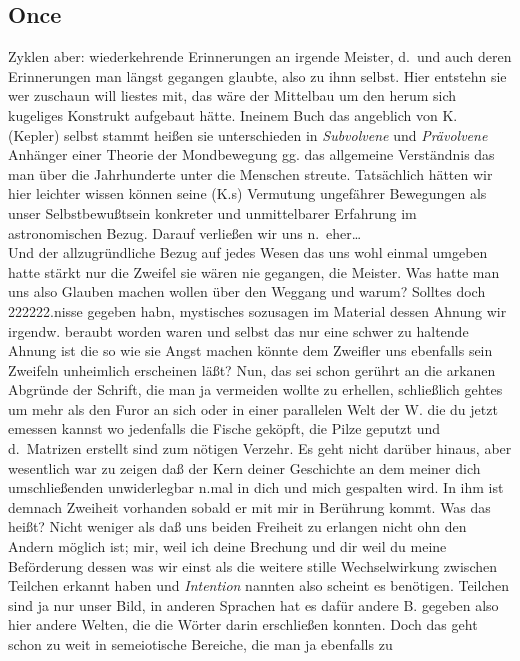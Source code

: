 \documentclass[
]{article}
\author{}
\date{\vspace{-2.5em}}
\begin{document}
\subsection{Once}\label{once}

Zyklen aber: wiederkehrende Erinnerungen an irgende Meister, d.~und auch
deren Erinnerungen man längst gegangen glaubte, also zu ihnn selbst.
Hier entstehn sie wer zuschaun will liestes mit, das wäre der Mittelbau
um den herum sich kugeliges Konstrukt aufgebaut hätte. Ineinem Buch das
angeblich von K. (Kepler) selbst stammt heißen sie unterschieden in
\emph{Subvolvene }und \emph{Prävolvene} Anhänger einer Theorie der
Mondbewegung gg. das allgemeine Verständnis das man über die
Jahrhunderte unter die Menschen streute. Tatsächlich hätten wir hier
leichter wissen können seine (K.s) Vermutung ungefährer Bewegungen als
unser Selbstbewußtsein konkreter und unmittelbarer Erfahrung im
astronomischen Bezug. Darauf verließen wir uns n.~eher\ldots{}\\
Und der allzugründliche Bezug auf jedes Wesen das uns wohl einmal
umgeben hatte stärkt nur die Zweifel sie wären nie gegangen, die
Meister. Was hatte man uns also Glauben machen wollen über den Weggang
und warum? Solltes doch 222222.nisse gegeben habn, mystisches sozusagen
im Material dessen Ahnung wir irgendw. beraubt worden waren und selbst
das nur eine schwer zu haltende Ahnung ist die so wie sie Angst machen
könnte dem Zweifler uns ebenfalls sein Zweifeln unheimlich erscheinen
läßt? Nun, das sei schon gerührt an die arkanen Abgründe der Schrift,
die man ja vermeiden wollte zu erhellen, schließlich gehtes um mehr als
den Furor an sich oder in einer parallelen Welt der W. die du jetzt
emessen kannst wo jedenfalls die Fische geköpft, die Pilze geputzt und
d.~Matrizen erstellt sind zum nötigen Verzehr. Es geht nicht darüber
hinaus, aber wesentlich war zu zeigen daß der Kern deiner Geschichte an
dem meiner dich umschließenden unwiderlegbar n.mal in dich und mich
gespalten wird. In ihm ist demnach Zweiheit vorhanden sobald er mit mir
in Berührung kommt. Was das heißt? Nicht weniger als daß uns beiden
Freiheit zu erlangen nicht ohn den Andern möglich ist; mir, weil ich
deine Brechung und dir weil du meine Beförderung dessen was wir einst
als die weitere stille Wechselwirkung zwischen Teilchen erkannt haben
und \emph{Intention }nannten also scheint es benötigen. Teilchen sind ja
nur unser Bild, in anderen Sprachen hat es dafür andere B. gegeben also
hier andere Welten, die die Wörter darin erschließen konnten. Doch das
geht schon zu weit in semeiotische Bereiche, die man ja ebenfalls zu
\end{document}

